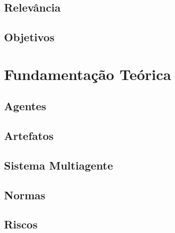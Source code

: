 \documentclass[openright]{normas-utf-tex} %
\begin{document}
	\section{Relevância}
		\label{relevance}
		

	\section{Objetivos}
		



\chapter{Fundamentação Teórica}
\label{chap:fundteoric}

	

	\section{Agentes} \label{agent}
 
		

	\section{Artefatos} \label{artefact}

		
 
	\section{Sistema Multiagente} \label{sma}

		

	\section{Normas} \label{normasdastani}
		


	\section{Riscos} \label{risksec}

				
\end{document}
